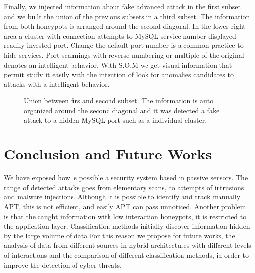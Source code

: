 \documentclass[a4paper]{llncs}
\begin{document}
Finally, we injected information about fake advanced attack in the first subset and we built the union of the previous subsets in a third subset. The information from both honeypots is arranged around the second diagonal. In the lower right area a cluster with connection attempts to MySQL service number displayed readily invested port. Change the default port number is a common practice to hide services. Port scannings with reverse numbering or multiple of the original denotes an intelligent behavior. With S.O.M we get visual information that permit study it easily with the intention of look for  anomalies candidates to attacks with a intelligent behavior.

\begin{figure}[h]
	\label{fig:internalTypes}
	\caption{Union between firs and second subset. The information is auto organized around the second diagonal and it was detected a fake attack to a hidden MySQL port such as a individual cluster.}
\end{figure}

\section{Conclusion and Future Works}
\label{sec:conclusion&future}
We have exposed how is possible a security system based in passive sensors. The range of detected attacks goes from elementary scans, to attempts of intrusions and malware injections. Although it is possible to identify and track manually APT, this is not efficient, and easily APT can pass unnoticed. Another problem is that the caught information with low interaction honeypots, it is restricted to the application layer. Classification methods initially discover information hidden by the large volume of data %
For this reason we propose for future works, the analysis of data from different sources in hybrid architectures with different levels of interactions and the comparison of different classification methods, in order to improve the detection of cyber threats.



\end{document}
